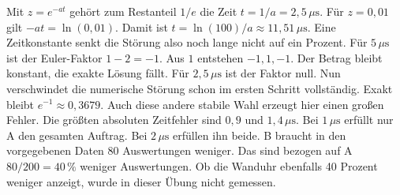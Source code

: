 \schreibfeld



Mit \(z=e^{-at}\) gehört zum Restanteil \(1/e\) die Zeit \(t=1/a=2{,}5\,\mu\mathrm s\). Für \(z=0{,}01\) gilt \(-at=\ln(0{,}01)\). Damit ist \(t=\ln(100)/a\approx11{,}51\,\mu\mathrm s\). Eine Zeitkonstante senkt die Störung also noch lange nicht auf ein Prozent.
Für \(5\,\mu\mathrm s\) ist der Euler-Faktor \(1-2=-1\). Aus \(1\) entstehen \(-1,1,-1\). Der Betrag bleibt konstant, die exakte Lösung fällt. Für \(2{,}5\,\mu\mathrm s\) ist der Faktor null. Nun verschwindet die numerische Störung schon im ersten Schritt vollständig. Exakt bleibt \(e^{-1}\approx0{,}3679\). Auch diese andere stabile Wahl erzeugt hier einen großen Fehler.
Die größten absoluten Zeitfehler sind \(0{,}9\) und \(1{,}4\,\mu\mathrm s\). Bei \(1\,\mu\mathrm s\) erfüllt nur A den gesamten Auftrag. Bei \(2\,\mu\mathrm s\) erfüllen ihn beide. B braucht in den vorgegebenen Daten 80 Auswertungen weniger. Das sind bezogen auf A \(80/200=40\,\%\) weniger Auswertungen. Ob die Wanduhr ebenfalls 40 Prozent weniger anzeigt, wurde in dieser Übung nicht gemessen.



